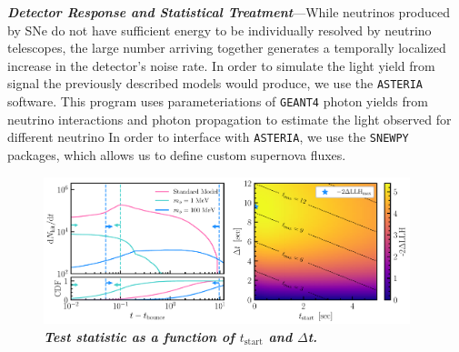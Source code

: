 
\textbf{\textit{Detector Response and Statistical Treatment}}---While neutrinos produced by SNe do not have sufficient energy to be individually resolved by neutrino telescopes, the large number arriving together generates a temporally localized increase in the detector's noise rate.
In order to simulate the light yield from signal the previously described models would produce, we use the \texttt{ASTERIA}~\cite{spencer_griswold_2020_3926835} software.
This program uses parameteriations of \texttt{GEANT4} photon yields from neutrino interactions and photon propagation to estimate the light observed for different neutrino 
In order to interface with \texttt{ASTERIA}, we use the \texttt{SNEWPY} packages, which allows us to define custom supernova fluxes.

\begin{figure}
    \centering
    \includegraphics[width=0.95\textwidth]{figures/hits_and_likelihood.pdf}
    \caption{\textbf{\textit{Test statistic as a function of $t_{\mathrm{start}}$ and $\Delta$t.}
    }}
    \label{fig:hits_and_likelihood}
\end{figure}